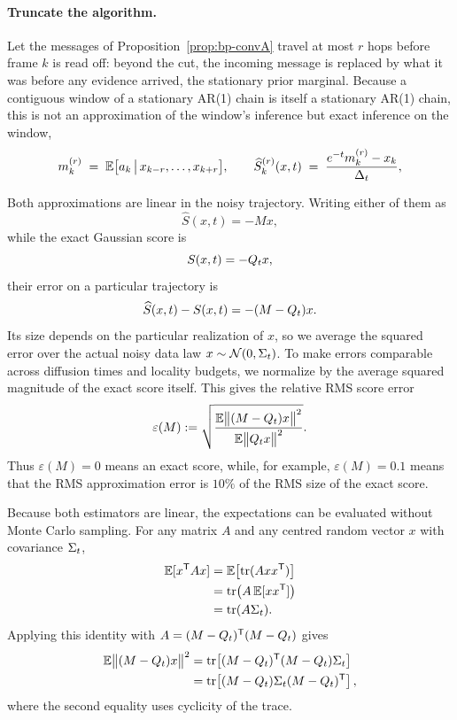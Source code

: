 \paragraph{Truncate the algorithm.} Let the messages of
Proposition~\ref{prop:bp-convA} travel at most $r$ hops before frame $k$ is
read off: beyond the cut, the incoming message is replaced by what it was
before any evidence arrived, the stationary prior marginal. Because a
contiguous window of a stationary AR(1) chain is itself a stationary AR(1)
chain, this is not an approximation of the window's inference but exact
inference on the window,
\begin{equation}
  m^{(r)}_k \;=\; \mathbb{E}\big[a_k \,\big|\, x_{k-r}, \dots, x_{k+r}\big],
  \qquad
  \widehat S^{(r)}_k(x,t) \;=\; \frac{e^{-t} m^{(r)}_k - x_k}{\Delta_t},
  \label{eq:bp-windowed}
\end{equation}

Both approximations are linear in the noisy trajectory. Writing either of
them as
\begin{equation}
  \widehat S(x,t)=-Mx,
\end{equation}
while the exact Gaussian score is
\begin{equation}
  S(x,t)=-Q_t x,
\end{equation}
their error on a particular trajectory is
\begin{equation}
  \widehat S(x,t)-S(x,t)
  =
  -(M-Q_t)x.
\end{equation}
Its size depends on the particular realization of $x$, so we average the
squared error over the actual noisy data law
$x\sim\mathcal{N}(0,\Sigma_t)$. To make errors comparable across diffusion times and
locality budgets, we normalize by the average squared magnitude of the exact
score itself. This gives the relative RMS score error
\begin{equation}
  \varepsilon(M)
  :=
  \sqrt{
    \frac{
      \mathbb{E}\bigl\|(M-Q_t)x\bigr\|^2
    }{
      \mathbb{E}\bigl\|Q_t x\bigr\|^2
    }
  }.
  \label{eq:bp-relerr-def}
\end{equation}
Thus $\varepsilon(M)=0$ means an exact score, while, for example,
$\varepsilon(M)=0.1$ means that the RMS approximation error is $10\%$ of the
RMS size of the exact score.

Because both estimators are linear, the expectations can be evaluated
without Monte Carlo sampling. For any matrix $A$ and any centred random
vector $x$ with covariance $\Sigma_t$,
\begin{align}
  \mathbb{E}[x^{\mathsf{T}}Ax]
  &=
  \mathbb{E}\!\left[\operatorname{tr}(Axx^{\mathsf{T}})\right] \\
  &=
  \operatorname{tr}\!\left(A\,\mathbb{E}[xx^{\mathsf{T}}]\right) \\
  &=
  \operatorname{tr}(A\Sigma_t).
  \label{eq:bp-quadratic-trace}
\end{align}
Applying this identity with
$A=(M-Q_t)^{\mathsf{T}}(M-Q_t)$ gives
\begin{align}
  \mathbb{E}\bigl\|(M-Q_t)x\bigr\|^2
  &=
  \operatorname{tr}\!\left[
    (M-Q_t)^{\mathsf{T}}(M-Q_t)\Sigma_t
  \right] \\
  &=
  \operatorname{tr}\!\left[
    (M-Q_t)\Sigma_t(M-Q_t)^{\mathsf{T}}
  \right],
  \label{eq:bp-error-numerator}
\end{align}
where the second equality uses cyclicity of the trace.

